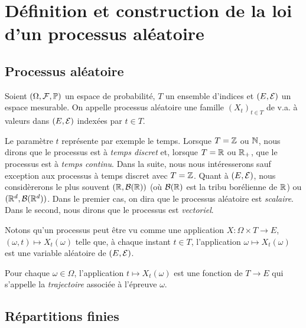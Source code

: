 \section{D\'efinition et construction de la loi d'un processus al\'eatoire}
\label{sec:gene}
\subsection{Processus al\'eatoire}

\begin{definition}
Soient $(\Omega,\mathcal{F},\mathbb{P})$ un espace de probabilit\'e, $T$ un
ensemble d'indices et $(E,\mathcal{E})$ un espace mesurable. On appelle
processus al\'eatoire une famille $(X_t)_{t \in T}$ de v.a. \`a
valeurs dans $(E,\mathcal{E})$ index\'ees par $t \in T$.
\end{definition}
Le param\`etre $t$ repr\'esente par exemple le temps. Lorsque $T=
\mathbb{Z}$ ou $\mathbb{N}$, nous dirons que le processus est \`a \emph{temps discret}
et, lorsque $T=\mathbb{R}$ ou $\mathbb{R}_+$, que le processus est \`a
\emph{temps continu}. Dans la suite, nous nous
int\'eresserons sauf exception aux processus \`a temps
discret avec $T= \mathbb{Z}$. Quant \`a $(E,\mathcal{E})$, nous consid\`ererons
le plus souvent $(\mathbb{R}, \mathcal{B}(\mathbb{R}))$ (o\`u $\mathcal{B}(\mathbb{R})$ est la
tribu bor\'elienne de $\mathbb{R}$) ou $(\mathbb{R}^d, \mathcal{B}(\mathbb{R}^d))$.
Dans le premier cas, on dira que le processus al\'eatoire est
\emph{scalaire}. Dans le second, nous dirons que le processus est
\emph{vectoriel}.

Notons qu'un processus peut \^{e}tre vu comme une application $X: \Omega
\times T \rightarrow E$, $(\omega,t)\mapsto X_t(\omega)$ telle que, \`a
chaque instant $t \in T$, l'application $\omega \mapsto X_t(\omega)$
est une variable al\'eatoire de $(E,\mathcal{E})$.
\begin{definition}
  Pour chaque $\omega\in \Omega$, l'application $t \mapsto
  X_t(\omega)$ est une fonction de $T \rightarrow E$ qui s'appelle la
  \emph{trajectoire} associ\'ee \`a l'\'epreuve $\omega$.
\end{definition}

\subsection{R\'epartitions finies}

